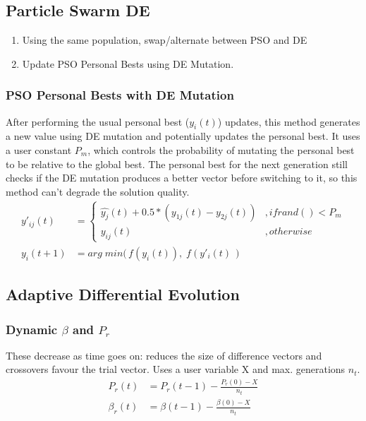 \subsection{Particle Swarm DE}
\begin{enumerate}
    \item Using the same population, swap/alternate between PSO and DE 
    \item Update PSO Personal Bests using DE Mutation.
\end{enumerate}

\subsubsection{PSO Personal Bests with DE Mutation}
After performing the usual personal best ($y_i(t)$) updates, this method generates a new value using DE mutation and potentially updates the personal best. It uses a user constant $P_m$, which controls the probability of mutating the personal best to be relative to the global best. The personal best for the next generation still checks if the DE mutation produces a better vector before switching to it, so this method can't degrade the solution quality. 
\begin{align}
    y'_{ij}(t) &= 
    \begin{cases}
        \hat{y_j}(t) + 0.5 * (y_{1j}(t) - y_{2j}(t)) &, if rand() < P_m \\
        y_{ij}(t) &, otherwise
    \end{cases} \\
    y_i(t+1) &= arg \; min(\, f(y_i(t)),\; f(y'_i(t) \,) \nonumber
\end{align}



\subsection{Adaptive Differential Evolution}

\subsubsection{Dynamic $\beta$ and $P_r$}
These decrease as time goes on: reduces the size of difference vectors and crossovers favour the trial vector. Uses a user variable X and max. generations $n_t$.
\begin{align}
    P_r(t) &= P_r(t-1) - \frac{P_r(0) - X}{n_t} \\
    \beta_r(t) &= \beta(t-1) - \frac{\beta(0) - X}{n_t}
\end{align}


